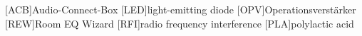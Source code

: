 
\begin{acronym}[ACRONYM]
[ACB]{Audio-Connect-Box}
[LED]{light-emitting diode}
[OPV]{Operationsverstärker}
[REW]{Room EQ Wizard}
[RFI]{radio frequency interference}
[PLA]{polylactic acid}
\end{acronym}\newpage

